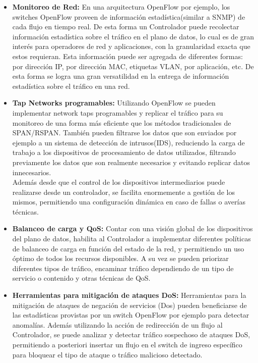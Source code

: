 \begin{itemize}

\item \textbf{Monitoreo de Red:}
En una arquitectura OpenFlow por ejemplo, los switches OpenFlow proveen de información estadística(similar a SNMP) de cada flujo en tiempo real. De esta forma un Controlador puede recolectar información estadística sobre el tráfico en el plano de datos, lo cual es de gran interés para operadores de red y aplicaciones, con la granularidad exacta que estos requieran. Esta información puede ser agregada de diferentes formas: por dirección IP, por dirección MAC, etiquetas VLAN, por aplicación, etc. De esta forma se logra una gran versatilidad en la entrega de información estadística sobre el tráfico en una red.

\item \textbf{Tap Networks programables:}
Utilizando OpenFlow se pueden implementar network taps programables y replicar el tráfico para su monitoreo de una forma más eficiente que los métodos tradicionales de SPAN/RSPAN. También pueden filtrarse los datos que son enviados por ejemplo a un sistema de detección de intrusos(IDS), reduciendo la carga de trabajo a los dispositivos de procesamiento de datos utilizados, filtrando previamente los datos que son realmente necesarios y evitando replicar datos innecesarios.\\
Además desde que el control de los dispositivos intermediarios puede realizarse desde un controlador, se facilita enormemente a gestión de los mismos, permitiendo una configuración dinámica en caso de fallas o averías técnicas.

\item \textbf{Balanceo de carga y QoS:}
Contar con una visión global de los dispositivos del plano de datos, habilita al Controlador a implementar diferentes políticas de balanceo de carga en función del estado de la red, y permitiendo un uso óptimo de todos los recursos disponibles. A su vez se pueden priorizar diferentes tipos de tráfico, encaminar tráfico dependiendo de un tipo de servicio o contenido y otras técnicas de QoS.

\item \textbf{Herramientas para mitigación de ataques DoS:}
Herramientas para la mitigación de ataques de negación de servicios (Dos) pueden beneficiarse de las estadísticas provistas por un switch OpenFlow por ejemplo para detectar anomalías. Además utilizando la acción de redirección de un flujo al Controlador, se puede analizar y detectar tráfico sospechoso de ataques DoS, permitiendo a posteriori insertar un flujo en el switch de ingreso específico para bloquear el tipo de ataque o tráfico malicioso detectado.


\end{itemize}
